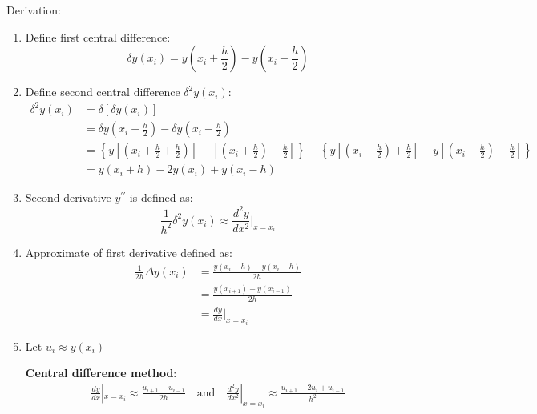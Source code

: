 \documentclass[10pt,a4paper]{article}
\begin{document}
Derivation:
\begin{enumerate}
    \item Define first central difference:
    $$
        \delta y(x_i)=y\left(x_i + \frac{h}{2}\right)-y\left(x_i-\frac{h}{2}\right)
    $$

    \item Define second central difference $\delta^2y(x_i)$:
    \begin{align*}
        \delta^2y(x_i)&=\delta[\delta y(x_i)]\\
        &= \delta y\left(x_i + \frac{h}{2}\right) - \delta y \left(x_i - \frac{h}{2}\right) \\
        &= \left\{y\left[\left(x_i + \frac{h}{2}+\frac{h}{2}\right)\right]-\left[\left(x_i+\frac{h}{2}\right)-\frac{h}{2}\right]\right\} - \left\{y\left[\left(x_i - \frac{h}{2}\right)+\frac{h}{2}\right]-y\left[\left(x_i - \frac{h}{2}\right)-\frac{h}{2}\right]\right\} \\
        &= y(x_i + h) - 2y(x_i) + y(x_i - h)
    \end{align*}

    \item Second derivative $y^{\prime \prime}$ is defined as:
    $$
        \frac{1}{h^2} \delta^2 y(x_i) \approx \frac{d^2y}{dx^2}|_{x=x_i}
    $$
    
    \item Approximate of first derivative defined as:
    \begin{align*}
        \frac{1}{2h}\Delta y(x_i) &= \frac{y(x_i+h)-y(x_i - h)}{2h} \\
        &= \frac{y(x_{i+1})-y(x_{i-1})}{2h} \\
        &= \frac{dy}{dx} |_{x=x_i}
    \end{align*}
    
    \item Let $u_i \approx  y(x_i)$
    \begin{tcolorbox}[breakable,colback=white,colframe=black,width=\dimexpr\textwidth+12mm\relax,enlarge left by=-6mm]
        \textbf{Central difference method}: 
    \begin{align*}
        \frac{dy}{dx}|_{x=x_i} \approx \frac{u_{i+1}-u_{i-1}}{2h} \quad \text{and} \quad \frac{d^2 y}{dx^2}|_{x=x_i} \approx \frac{u_{i+1}-2u_i+u_{i-1}}{h^2}
    \end{align*}
    \end{tcolorbox}
\end{enumerate}
\end{document}
